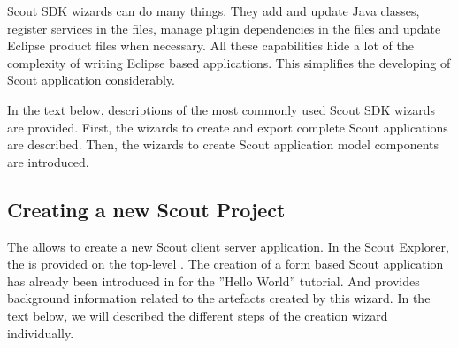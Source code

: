 \documentclass[a4paper,10pt,twoside]{book}
\begin{document}
Scout SDK wizards can do many things. 
They add and update Java classes, register services in the  files, manage plugin dependencies in the  files and update Eclipse product files when necessary. 
All these capabilities hide a lot of the complexity of writing Eclipse based applications. 
This simplifies the developing of Scout application considerably.

In the text below, descriptions of the most commonly used Scout SDK wizards are provided. 
First, the wizards to create and export complete Scout applications are described. 
Then, the wizards to create Scout application model components are introduced. 

\subsection{Creating a new Scout Project}

The  allows to create a new Scout client server application. 
In the Scout Explorer, the  is provided on the top-level . 
The creation of a form based Scout application has already been introduced in  for the ''Hello World'' tutorial.
And  provides background information related to the artefacts created by this wizard. 
In the text below, we will described the different steps of the creation wizard individually.
\end{document}
